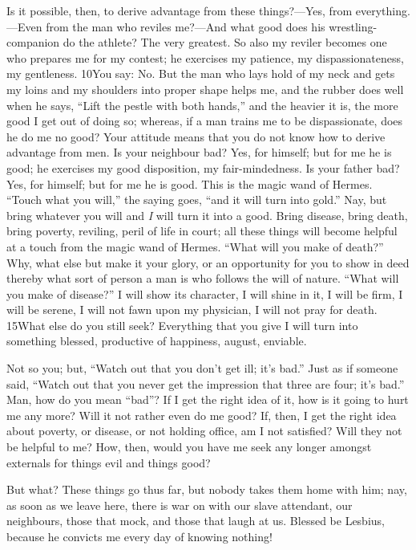 Is it possible, then, to derive advantage from these things?—Yes, from everything.—Even from the man who reviles me?—And what good does his wrestling-companion do the athlete? The very greatest. So also my reviler becomes one who prepares me for my contest; he exercises my patience, my dispassionateness, my gentleness. 10You say: No. But the man who lays hold of my neck and gets my loins and my shoulders into proper shape helps me, and the rubber does well when he says, ``Lift the pestle with both hands,'' and the heavier it is, the more good I get out of doing so; whereas, if a man trains me to be dispassionate, does he do me no good? Your attitude means that you do not know how to derive advantage from men. Is your neighbour bad? Yes, for himself; but for me he is good; he exercises my good disposition, my fair-mindedness. Is your father bad? Yes, for himself; but for me he is good. This is the magic wand of Hermes. ``Touch what you will,'' the saying goes, ``and it will turn into gold.'' Nay, but bring whatever you will and \emph{I} will turn it into a good. Bring disease, bring death, bring poverty, reviling, peril of life in court; all these things will become helpful at a touch from the magic wand of Hermes. ``What will you make of death?'' Why, what else but make it your glory, or an opportunity for you to show in deed thereby what sort of person a man is who follows the will of nature. ``What will you make of disease?'' I will show its character, I will shine in it, I will be firm, I will be serene, I will not fawn upon my physician, I will not pray for death. 15What else do you still seek? Everything that you give I will turn into something blessed, productive of happiness, august, enviable.

Not so you; but, ``Watch out that you don't get ill; it's bad.'' Just as if someone said, ``Watch out that you never get the impression that three are four; it's bad.'' Man, how do you mean ``bad''? If I get the right idea of it, how is it going to hurt me any more? Will it not rather even do me good? If, then, I get the right idea about poverty, or disease, or not holding office, am I not satisfied? Will they not be helpful to me? How, then, would you have me seek any longer amongst externals for things evil and things good?

But what? These things go thus far, but nobody takes them home with him; nay, as soon as we leave here, there is war on with our slave attendant, our neighbours, those that mock, and those that laugh at us. Blessed be Lesbius, because he convicts me every day of knowing nothing!

